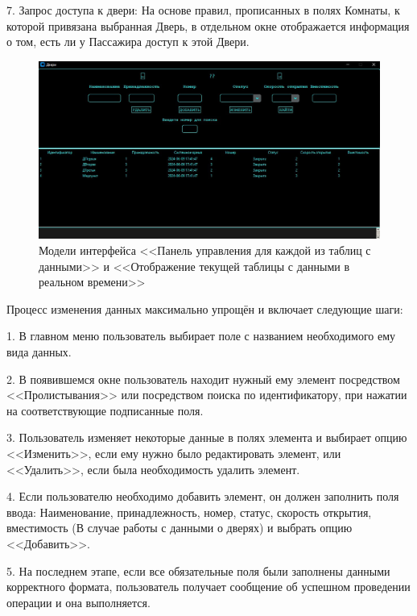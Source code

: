 7. Запрос доступа к двери: На основе правил, прописанных в полях Комнаты, к которой привязана выбранная Дверь, в отдельном окне отображается информация о том, есть ли у Пассажира доступ к этой Двери.

\begin{figure} [ht]
	\centering
	\includegraphics[width=1\linewidth]{images/Example2}
	\caption{Модели интерфейса <<Панель управления для каждой из таблиц с данными>> и <<Отображение текущей таблицы с данными в реальном времени>>}
	\label{fig:example2}
\end{figure}

Процесс изменения данных максимально упрощён и включает следующие шаги:

1. В главном меню пользователь выбирает поле с названием необходимого ему вида данных.

2. В появившемся окне пользователь находит нужный ему элемент посредством <<Пролистывания>> или посредством поиска по идентификатору, при нажатии на соответствующие подписанные поля.

3. Пользователь изменяет некоторые данные в полях элемента и выбирает опцию <<Изменить>>, если ему нужно было редактировать элемент, или <<Удалить>>, если была необходимость удалить элемент.

4. Если пользователю необходимо добавить элемент, он должен заполнить поля ввода: Наименование, принадлежность, номер, статус, скорость открытия, вместимость (В случае работы с данными о дверях) и выбрать опцию <<Добавить>>.

5. На последнем этапе, если все обязательные поля были заполнены данными корректного формата, пользователь получает сообщение об успешном проведении операции и она выполняется.

